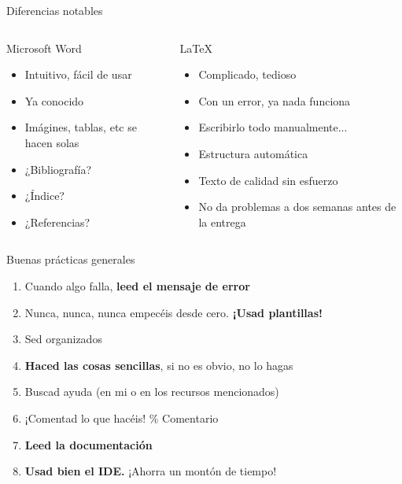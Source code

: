 \documentclass[12pt]{beamer}
\begin{document}
\begin{frame}[t]{Diferencias notables}
	\begin{columns}[t]
		\begin{column}{0.4\textwidth}
			Microsoft Word
			\begin{itemize}
				\item Intuitivo, fácil de usar
				\item Ya conocido
				\item Imágines, tablas, etc se hacen solas \\
				\hrulefill
				\item ¿Bibliografía?
				\item ¿Índice?
				\item ¿Referencias?
			\end{itemize}
		\end{column}
		\begin{column}{0.55\textwidth}
			\LaTeX
			\begin{itemize}
				\item Complicado, tedioso
				\item Con un error, ya nada funciona
				\item Escribirlo todo manualmente...\\
				\hrulefill
				\item Estructura automática
				\item Texto de calidad sin esfuerzo
				\item No da problemas a dos semanas antes de la entrega
			\end{itemize}
		\end{column}
	\end{columns}
\end{frame}

\begin{frame}{Buenas prácticas generales}
	\large
	\begin{enumerate}
		\item Cuando algo falla, \textbf{leed el mensaje de error}
		\item Nunca, nunca, nunca empecéis desde cero. \textbf{¡Usad plantillas!}
		\item Sed organizados
		\item \textbf{Haced las cosas sencillas}, si no es obvio, no lo hagas
		\item Buscad ayuda (en mi o en los recursos mencionados)
		\item ¡Comentad lo que hacéis! \% Comentario
		\item \textbf{Leed la documentación}
		\item \textbf{Usad bien el IDE.} ¡Ahorra un montón de tiempo! 
	\end{enumerate}
\end{frame}
\end{document}
